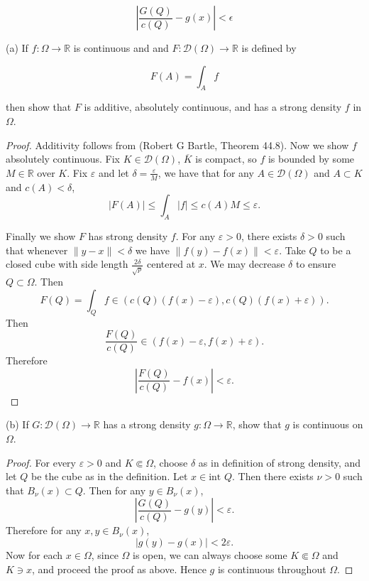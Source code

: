 $$
\left|\frac{G(Q)}{c(Q)}-g(x)\right|<\epsilon
$$

(a) If $f: \Omega \rightarrow \mathbb{R}$ is continuous and and $F: \mathcal{D}(\Omega) \rightarrow \mathbb{R}$ is defined by

$$
F(A)=\int_{A} f
$$

then show that $F$ is additive, absolutely continuous, and has a strong density $f$ in $\Omega$.

\begin{proof}
	Additivity follows from (Robert G Bartle, Theorem 44.8). Now we show $f$ absolutely continuous. Fix $K \in \mathcal{D}(\Omega)$, $\overline{K} $ is compact, so $f$ is bounded by some $M \in \mathbb{R}$ over $K$. Fix $\varepsilon$ and let $\delta = \frac{\varepsilon}{M}$, we have that for any $A \in \mathcal{D}(\Omega)$ and $A \subset K$ and $c(A) < \delta$,
	\[
		|F(A)| \le \int _A |f| \le c(A) M \le \varepsilon
	.\] 

	Finally we show $F$ has strong density $f$. For any $\varepsilon>0$, there exists $\delta>0$ such that whenever $\|y - x\|<\delta$ we have $\| f(y) - f(x)\|<\varepsilon$. Take $Q$ to be a closed cube with side length $\frac{2\delta}{\sqrt{p} }$ centered at $x$. We may decrease $\delta$ to ensure $Q \subset \Omega$. Then
	\[
		F(Q) = \int _Q  f \in \left( c(Q) (f(x) - \varepsilon), c(Q) (f(x) + \varepsilon) \right) 
	.\] 
	Then
	\[
		\frac{F(Q)}{c(Q)} \in \left( f(x) - \varepsilon, f(x) + \varepsilon \right) 
	.\] 
	Therefore
	\[
		\left| \frac{F(Q)}{c(Q)} - f(x) \right| < \varepsilon
	.\] 


\end{proof} 


\newpage
(b) If $G: \mathcal{D}(\Omega) \rightarrow \mathbb{R}$ has a strong density $g: \Omega \rightarrow \mathbb{R}$, show that $g$ is continuous on $\Omega$.
\begin{proof}
	For every $\varepsilon>0$ and $K \Subset \Omega$, choose $\delta$ as in definition of strong density, and let $Q $ be the cube as in the definition. Let $x \in \text{int } Q$. Then there exists $\nu >0$  such that $B_\nu (x) \subset Q$. Then for any $y \in B_\nu(x)$,
	\[
		\left| \frac{G(Q)}{c(Q)} - g(y) \right|  < \varepsilon
	.\] 
	Therefore for any $x, y \in B_\nu(x)$,
	\[
		\left| g(y) - g(x) \right| < 2\varepsilon
	.\] 
	Now for each $x \in \Omega$, since $\Omega$ is open, we can always choose some $K \Subset \Omega$ and $K \ni x$, and proceed the proof as above. Hence $g$ is continuous throughout $\Omega$.
\end{proof}


